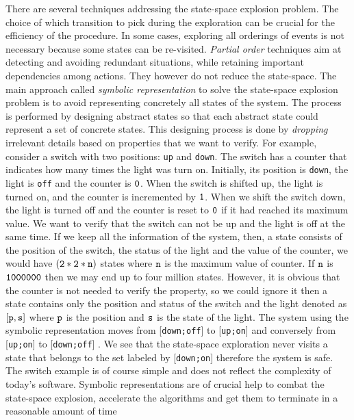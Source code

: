 There are several techniques addressing the state-space explosion problem.
The choice of which transition to pick during the exploration can be
crucial for the efficiency of the procedure. In some cases, exploring all orderings of events is not necessary because some states can be re-visited. \emph{Partial order} techniques aim at detecting and avoiding
redundant situations, while retaining important dependencies among
actions. They however do not reduce the state-space. The main approach called \emph{symbolic
  representation}  to solve the state-space explosion problem is to avoid representing concretely all states of the system. The process is performed by designing abstract states so that each abstract state could represent a set of concrete states.  This designing process is done by \emph{dropping} irrelevant details based on properties that we want to verify. For example, consider a switch with two positions: {\tt up} and {\tt down}. The switch has a counter that indicates how many times the light was turn on. Initially, its position is {\tt down}, the light is {\tt off} and the counter is $\tt 0$. When the switch is shifted up, the light is turned on, and the counter is incremented by $\tt 1$. When we shift the switch down, the light is turned off and the counter is reset to $\tt 0$ if it had reached its maximum value. We want to verify that the switch can not be up and the light is off at the same time. If we keep all the information of the system, then, a state consists of the position of the switch, the status of the light and the value of the counter, we would have $\tt (2*2*n)$ states where $\tt n$ is the maximum value of counter. If $\tt n$ is $\tt 1000000$ then we may end up to four million states.  However, it is obvious that the counter is not needed to verify the property, so we could ignore it then a state contains only the position and status of the switch and the light denoted as $\tt [p,s]$ where $\tt p$ is the position and $\tt s$ is the state of the light. The system using the symbolic representation moves from  [{\tt down;off}]  to  [{\tt up;on}]  and conversely from  [{\tt up;on}]  to  [{\tt down;off}] . We see that the state-space exploration never visits a state that belongs to the set labeled by  [{\tt down;on}]  therefore the system is safe. The switch example is of course simple and does not reflect the complexity of today’s software. Symbolic representations are of crucial help to combat the state-space explosion, accelerate the algorithms and get them to terminate in a reasonable amount of time

